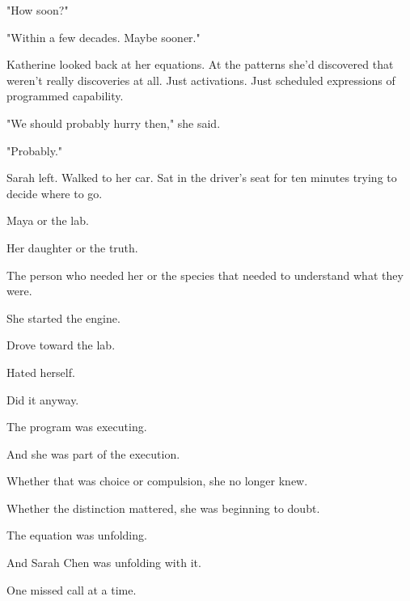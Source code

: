 "How soon?"

"Within a few decades. Maybe sooner."

Katherine looked back at her equations. At the patterns she'd discovered that weren't really discoveries at all. Just activations. Just scheduled expressions of programmed capability.

"We should probably hurry then," she said.

"Probably."

Sarah left. Walked to her car. Sat in the driver's seat for ten minutes trying to decide where to go.

Maya or the lab.

Her daughter or the truth.

The person who needed her or the species that needed to understand what they were.

She started the engine.

Drove toward the lab.

Hated herself.

Did it anyway.

The program was executing.

And she was part of the execution.

Whether that was choice or compulsion, she no longer knew.

Whether the distinction mattered, she was beginning to doubt.

The equation was unfolding.

And Sarah Chen was unfolding with it.

One missed call at a time.

